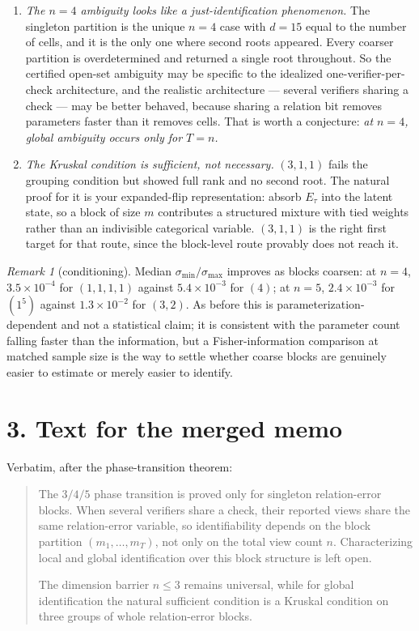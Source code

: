 \documentclass[11pt]{article}
\theoremstyle{remark}
\newtheorem*{remark}{Remark}
\begin{document}
\begin{enumerate}
\item \emph{The $n=4$ ambiguity looks like a just-identification phenomenon.} The singleton partition is the unique $n=4$ case with $d=15$ equal to the number of cells, and it is the only one where second roots appeared. Every coarser partition is overdetermined and returned a single root throughout. So the certified open-set ambiguity may be specific to the idealized one-verifier-per-check architecture, and the realistic architecture --- several verifiers sharing a check --- may be better behaved, because sharing a relation bit removes parameters faster than it removes cells. That is worth a conjecture: \emph{at $n=4$, global ambiguity occurs only for $T=n$.}
\item \emph{The Kruskal condition is sufficient, not necessary.} $(3,1,1)$ fails the grouping condition but showed full rank and no second root. The natural proof for it is your expanded-flip representation: absorb $E_\tau$ into the latent state, so a block of size $m$ contributes a structured mixture with tied weights rather than an indivisible categorical variable. $(3,1,1)$ is the right first target for that route, since the block-level route provably does not reach it.
\end{enumerate}

\begin{remark}[conditioning]
Median $\sigma_{\min}/\sigma_{\max}$ improves as blocks coarsen: at $n=4$, $3.5\times10^{-4}$ for $(1,1,1,1)$ against $5.4\times10^{-3}$ for $(4)$; at $n=5$, $2.4\times10^{-3}$ for $(1^5)$ against $1.3\times10^{-2}$ for $(3,2)$. As before this is parameterization-dependent and not a statistical claim; it is consistent with the parameter count falling faster than the information, but a Fisher-information comparison at matched sample size is the way to settle whether coarse blocks are genuinely easier to estimate or merely easier to identify.
\end{remark}

\section*{3. Text for the merged memo}

Verbatim, after the phase-transition theorem:

\begin{quote}
The $3/4/5$ phase transition is proved only for singleton relation-error blocks. When several verifiers share a check, their reported views share the same relation-error variable, so identifiability depends on the block partition $(m_1,\dots,m_T)$, not only on the total view count $n$. Characterizing local and global identification over this block structure is left open.

The dimension barrier $n\le3$ remains universal, while for global identification the natural sufficient condition is a Kruskal condition on three groups of whole relation-error blocks.
\end{quote}
\end{document}

